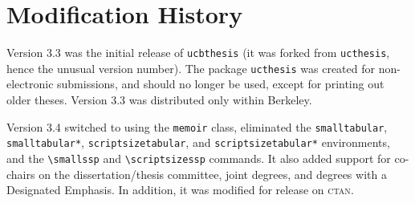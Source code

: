 \documentclass[11pt]{article}
\newcommand*{\pkg}[1]{\texttt{#1}}
\begin{document}
\section{Modification History}

Version 3.3 was the initial release of \pkg{ucbthesis} (it was forked from
\pkg{ucthesis}, hence the unusual version number).  The package \pkg{ucthesis}
was created for non-electronic submissions, and should no longer be used,
except for printing out older theses.  Version 3.3 was distributed only within
Berkeley.

Version 3.4 switched to using the \pkg{memoir} class, eliminated the
\texttt{smalltabular}, \texttt{smalltabular*}, \texttt{scriptsizetabular},
and\break
\texttt{scriptsizetabular*} environments, and the \lstinline!\smallssp!
and\break
\lstinline!\scriptsizessp! commands.  It also added support for co-chairs
on the dissertation/thesis committee, joint degrees, and degrees with a
Designated Emphasis.  In addition, it was modified for release on \textsc{ctan}.
\end{document}
